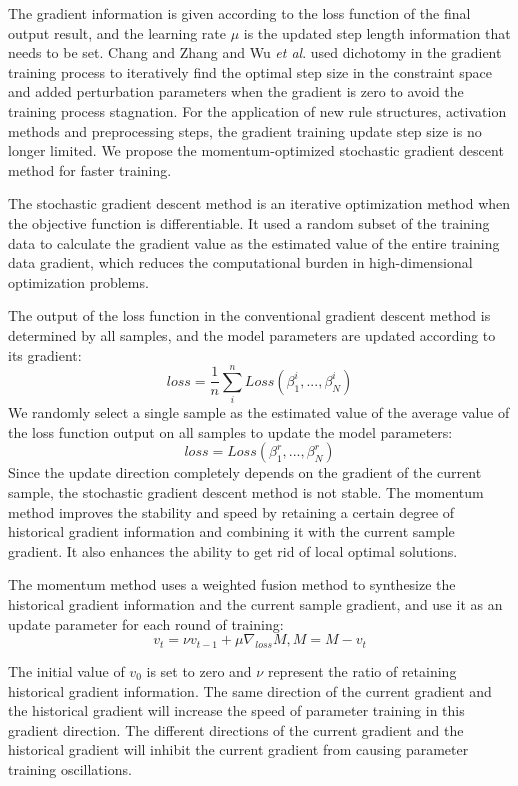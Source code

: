 \documentclass{ieeeaccess}
\begin{document}
The gradient information is given according to the loss function of the final output result, and the learning rate $\mu$ is the updated step length information that needs to be set.
Chang and Zhang\cite{a11} and Wu \textit{et al}.\cite{a13} used dichotomy in the gradient training process to iteratively find the optimal step size in the constraint space and
added perturbation parameters when the gradient is zero to avoid the training process stagnation.
For the application of new rule structures, activation methods and preprocessing steps, the gradient training update step size is no longer limited.
We propose the momentum-optimized stochastic gradient descent method for faster training.

The stochastic gradient descent method is an iterative optimization method when the objective function is differentiable.
It used a random subset of the training data to calculate the gradient value as the estimated value of the entire training data gradient,
which reduces the computational burden in high-dimensional optimization problems.

The output of the loss function in the conventional gradient descent method is determined by all samples,
and the model parameters are updated according to its gradient:
\begin{equation}
    loss=\frac{1}{n}\sum_i^nLoss(\beta_1^i,...,\beta_N^i)
\end{equation}
We randomly select a single sample as the estimated value of the average value of the loss function output on all samples to update the model parameters:
\begin{equation}
    loss=Loss(\beta_1^r,...,\beta_N^r)
\end{equation}
Since the update direction completely depends on the gradient of the current sample, the stochastic gradient descent method is not stable.
The momentum method improves the stability and speed by retaining a certain degree of historical gradient information and combining it with the current sample gradient.
It also enhances the ability to get rid of local optimal solutions.

The momentum method uses a weighted fusion method to synthesize the historical gradient information and the current sample gradient,
and use it as an update parameter for each round of training:
\begin{equation}
    v_t=\nu v_{t-1}+\mu\nabla_{loss}M,M=M-v_t
\end{equation}

The initial value of $v_0$ is set to zero and $\nu$ represent the ratio of retaining historical gradient information.
The same direction of the current gradient and the historical gradient will increase the speed of parameter training in this gradient direction.
The different directions of the current gradient and the historical gradient will inhibit the current gradient from causing parameter training oscillations.
\end{document}
